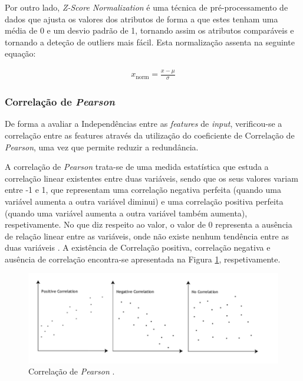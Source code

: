 \documentclass[12pt,a4paper,twoside]{report}
\begin{document}
{Por outro lado, \textit{Z-Score Normalization} é uma técnica de pré-processamento de dados que ajusta os valores dos atributos de forma a que estes tenham uma média de 0 e um desvio padrão de 1, tornando assim os atributos comparáveis e tornando a deteção de outliers mais fácil. Esta normalização assenta na seguinte equação:

\begin{align}
x_{\text{norm}} = \frac{x - \mu}{\sigma}\label{eq:zscore}
\end{align}

\subsubsection{Correlação de \textit{Pearson}}

De forma a avaliar a Independências entre as \textit{features} de \textit{input}, verificou-se a correlação entre as features através da utilização do coeficiente de Correlação de \textit{Pearson}, uma vez que permite reduzir a redundância.


A correlação de \textit{Pearson} trata-se de uma medida estatística que estuda a correlação linear existentes entre duas variáveis, sendo que os seus valores variam entre -1 e 1, que representam uma correlação negativa perfeita (quando uma variável aumenta a outra variável diminui) e uma correlação positiva perfeita (quando uma variável aumenta a outra variável também aumenta), respetivamente. No que diz respeito ao valor, o valor de 0 representa a ausência de relação linear entre as variáveis, onde não existe nenhum tendência entre as duas variáveis \cite{Akoglu2018}. A existência de Correlação positiva, correlação negativa e ausência de correlação encontra-se apresentada na Figura \ref{fig:pearson}, respetivamente.

\begin{figure}[H]
    \centering
    \includegraphics[width=1\textwidth]{imagens/pearsoncorrelation.png}
    \caption{Correlação de \textit{Pearson} \cite{pearson_website}.}
    \label{fig:pearson}
\end{figure}


}
\end{document}
